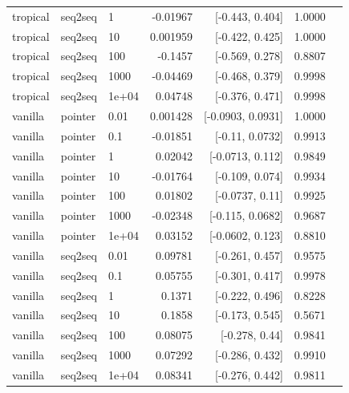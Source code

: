 \documentclass[10pt]{article}
\begin{document}
{\begin{longtable}{lllrrrl}
tropical & seq2seq & 1 & -0.01967 & [-0.443, 0.404] & 1.0000 & \\
tropical & seq2seq & 10 & 0.001959 & [-0.422, 0.425] & 1.0000 & \\
tropical & seq2seq & 100 & -0.1457 & [-0.569, 0.278] & 0.8807 & \\
tropical & seq2seq & 1000 & -0.04469 & [-0.468, 0.379] & 0.9998 & \\
tropical & seq2seq & 1e+04 & 0.04748 & [-0.376, 0.471] & 0.9998 & \\
vanilla & pointer & 0.01 & 0.001428 & [-0.0903, 0.0931] & 1.0000 & \\
vanilla & pointer & 0.1 & -0.01851 & [-0.11, 0.0732] & 0.9913 & \\
vanilla & pointer & 1 & 0.02042 & [-0.0713, 0.112] & 0.9849 & \\
vanilla & pointer & 10 & -0.01764 & [-0.109, 0.074] & 0.9934 & \\
vanilla & pointer & 100 & 0.01802 & [-0.0737, 0.11] & 0.9925 & \\
vanilla & pointer & 1000 & -0.02348 & [-0.115, 0.0682] & 0.9687 & \\
vanilla & pointer & 1e+04 & 0.03152 & [-0.0602, 0.123] & 0.8810 & \\
vanilla & seq2seq & 0.01 & 0.09781 & [-0.261, 0.457] & 0.9575 & \\
vanilla & seq2seq & 0.1 & 0.05755 & [-0.301, 0.417] & 0.9978 & \\
vanilla & seq2seq & 1 & 0.1371 & [-0.222, 0.496] & 0.8228 & \\
vanilla & seq2seq & 10 & 0.1858 & [-0.173, 0.545] & 0.5671 & \\
vanilla & seq2seq & 100 & 0.08075 & [-0.278, 0.44] & 0.9841 & \\
vanilla & seq2seq & 1000 & 0.07292 & [-0.286, 0.432] & 0.9910 & \\
vanilla & seq2seq & 1e+04 & 0.08341 & [-0.276, 0.442] & 0.9811 & \\
\bottomrule
\end{longtable}
}
\end{document}
